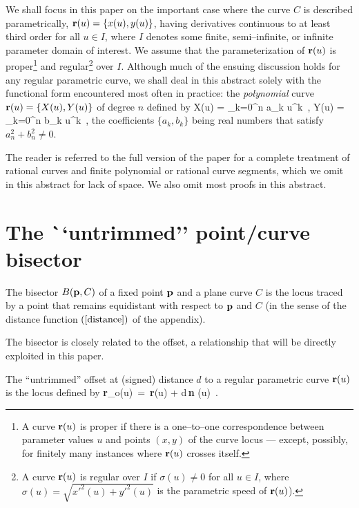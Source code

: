 We shall focus in this paper on the important case where the curve $C$
is described parametrically, ${\bf r}(u)=\{x(u),y(u)\}$, having
derivatives
continuous to at least third order for all $u \in I$, where $I$
denotes some finite, semi--infinite, or infinite parameter domain
of interest. We assume that the parameterization of ${\bf r}(u)$
is proper\footnote{A curve ${\bf r}(u)$ is proper if there 
is a one--to--one correspondence
between parameter values $u$ and points $(x,y)$ of the curve
locus --- except, possibly, for finitely many instances where
${\bf r}(u)$ crosses itself.}
and regular\footnote{A curve ${\bf r}(u)$ is regular over $I$ if
	$\sigma(u)\not=0$ for all $u \in I$, where 
	$\sigma(u) = \sqrt{x'^2(u)+y'^2(u)}$ is 
	the parametric speed of ${\bf r}(u)$).}
over $I$.
Although much of the ensuing discussion holds for any regular
parametric curve, we shall deal in this abstract solely with the functional
form encountered most often in practice: the {\it polynomial\/}
curve ${\bf r}(u)=\{X(u),Y(u)\}$ of degree $n$ defined by
\be \label{polycurve}
X(u) = \sum_{k=0}^n a_k u^k \,, \quad
Y(u) = \sum_{k=0}^n b_k u^k \,,
\ee
the coefficients $\{a_k,b_k\}$ being real numbers that satisfy
$a_n^2+b_n^2\not=0$.

The reader is referred to the full version of the paper \cite{faroukijj91} 
for a complete treatment of rational curves and finite polynomial
or rational curve segments, 
which we omit in this abstract for lack of space.
We also omit most proofs in this abstract.

\section{The {\mbox ``untrimmed'' point/curve} bisector}
\label{sec:untrim}

\begin{dfn} \label{defbsctr}
The bisector $B({\bf p},C)$ of a fixed point ${\bf p}$ and a plane curve $C$
is the locus traced by a point that remains equidistant with respect
to ${\bf p}$ and $C$ (in the sense of the distance function $(\ref{distance})$
of the appendix).
\end{dfn}

The bisector is closely related to the offset, a relationship that will
be directly exploited in this paper.

\begin{dfn}
The ``untrimmed'' offset at (signed) distance $d$ to a regular parametric
curve ${\bf r}(u)$ is the locus defined by
\be \label{offset}
{\bf r}_o(u) \,=\, {\bf r}(u) + d\,{\bf n} (u) \,.
\ee
\end{dfn}

